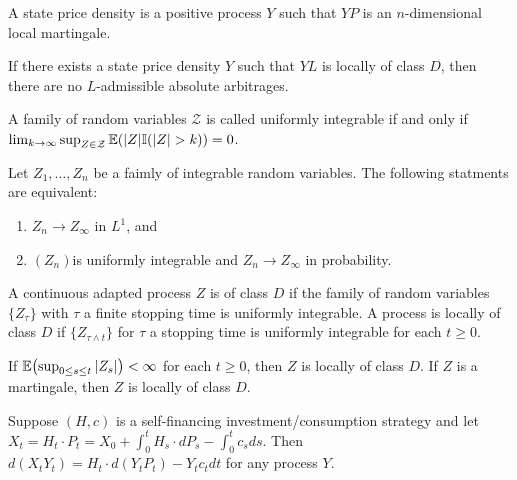 \begin{defn}
  \label{sec:arbitr-theory-cont-5}
  A state price density is a positive \ito process $Y$ such that $YP$
  is an $n$-dimensional local martingale.
\end{defn}

\begin{thm}
  \label{sec:arbitr-theory-cont-6}
  If there exists a state price density $Y$ such that $YL$ is locally
  of class $D$, then there are no $L$-admissible absolute arbitrages.
\end{thm}

\begin{defn}
  \label{sec:arbitr-theory-cont-7}
  A family of random variables $\mathcal{Z}$ is called uniformly
  integrable if and only if $\lim_{k \rightarrow \infty} \sup_{Z \in
    \mathcal{Z}} \E{|Z| \I{|Z| > k}} = 0$.
\end{defn}

\begin{thm}
  \label{sec:arbitr-theory-cont-8}
  Let $Z_{1}, \dots, Z_{n}$ be a faimly of integrable random
  variables. The following statments are equivalent:
  \begin{enumerate}
  \item $Z_{n} \rightarrow Z_{\infty}$ in $L^{1}$, and
  \item $(Z_{n})$is uniformly integrable and $Z_{n} \rightarrow
    Z_{\infty}$ in probability.
  \end{enumerate}
\end{thm}

\begin{defn}
  \label{sec:arbitr-theory-cont-9}
  A continuous adapted process $Z$ is of class $D$ if the family of
  random variables $\{ Z_{\tau} \}$ with $\tau$ a finite stopping time
  is uniformly integrable.  A process is locally of class $D$ if $\{
  Z_{\tau \wedge t} \} $ for $\tau$ a stopping time is uniformly
  integrable for each $t \geq 0$.

  If $\E{\sup_{0 \leq s \leq t}|Z_{s}|} < \infty$ for each $t \geq 0$,
  then $Z$ is locally of class $D$.  If $Z$ is a martingale, then $Z$
  is locally of class $D$.
\end{defn}

\begin{thm}
  \label{sec:arbitr-theory-cont-1}
  Suppose $(H, c)$ is a self-financing investment/consumption strategy
  and let $X_{t} = H_{t} \cdot P_{t} = X_{0} + \int_{0}^{t} H_{s}
  \cdot dP_{s} - \int_{0}^{t} c_{s} ds$.  Then $d(X_{t} Y_{t}) = H_{t}
  \cdot d(Y_{t} P_{t}) - Y_{t} c_{t} dt$ for any \ito process $Y$.
\end{thm}

